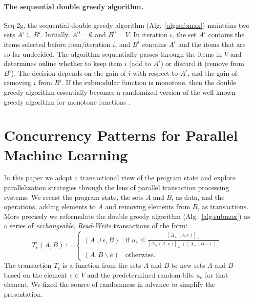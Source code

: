 \documentclass{article} %
\newcommand{\seqalg}{Seq-2g}
\newcommand{\algref}[1]{Alg.~\ref{#1}}
\newcommand{\hinge}[1]{\left[  #1 \right]_+}
\newcommand{\union}{\cup}
\begin{document}

\paragraph{The sequential double greedy algorithm.}
\seqalg{}, the sequential double greedy algorithm (\algref{alg:submax}) maintains two sets $A^i \subseteq B^i$. Initially, $A^0 = \emptyset$ and $B^0 = V$. In iteration $i$, the set $A^i$ contains the items selected before item/iteration $i$, and $B^i$ contains $A^i$ and the items that are so far undecided. The algorithm sequentially passes through the items in $V$ and determines online whether to keep item $i$ (add to $A^i$) or discard it (remove from $B^i$). The decision depends on the gain of $i$ with respect to $A^i$, and the gain of removing $i$ from $B^i$.
If the submodular function is monotone, then the double greedy algorithm essentially becomes a randomized version of the well-known greedy algorithm for monotone functions \citep{nemhauser1978}.









\section{Concurrency Patterns for Parallel Machine Learning \label{sec:concurrencycontrol}}

In this paper we adopt a transactional view of the program state and explore parallelization strategies through the lens of parallel transaction processing systems.
We recast the program state, the sets $A$ and $B$, as data, and the operations, adding elements to $A$ and removing elements from $B$, as transactions.
More precisely we reformulate the double greedy algorithm (\algref{alg:submax}) as a series of \emph{exchangeable}, \emph{Read-Write} transactions of the form:
\begin{equation}
T_e(A,B) :=
\begin{cases}
   (A \union e, B) & \text{if } u_e \leq \frac{\hinge{\Delta_+(A,e)}}{ \hinge{\Delta_+(A,e)} + \hinge{\Delta_-(B,e)}}  \\
   (A, B \backslash e) & \text{otherwise. }
  \end{cases}
  \label{eqn:greedytransaction}
\end{equation}
The transaction $T_e$ is a function from the sets $A$ and $B$ to new sets $A$ and $B$ based on the element $e \in V$ and the predetermined random bits $u_e$ for that element.
We fixed the source of randomness in advance to simplify the presentation. %
\end{document}
